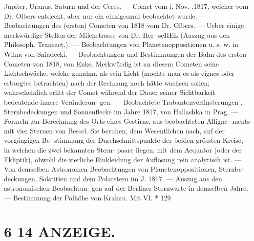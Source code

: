 \documentclass[12pt,a4paper]{article}
\begin{document}
{{{{{{{{Jupiter,  Uranus,  Saturn  und  der  Ceres.  ---   Comet  vom  i,  Nov.  .1817,  welcher vom  Dr.  Olbers  entdeckt,  aber  nur  ein  einzigesmal  beobachtet  wurde.  ---      Beobachtungen  des  (ersten) Cometen  von  1818  vom  Dr.  Olbers.  ---     Ueber  einige  merkwürdige  Stellen  der  Milchstrasse  von  Dr.  Her- scHEL  (Auszug  aus  den   Philosoph.   Transact.).  ---      Beobachtungen  von   Planetenoppositionen  u.  s.  w.    in Wilna  von  Sniadecki.  ---      Beobachtungen   und  Bestimmungen   der   Bahn   des   ersten  Cometen  von  1818, von  Enke.      Merkwürdig  ist  an  diesem  Cometen   seine   Lichtschwäche,   welche   zunahm,   als   sein   Licht (mochte  man  es  als  eignes  oder   erborgtes  betrachten)   nach  der  Rechnung  noch  hätte  wachsen  sollen; wahrscheinlich  erlitt  der  Comet  während  der  Dauer  seiner  Sichtbarkeit  bedeutende  innere  Veränderun- gen. ---     Beobachtete  Trabantenverfinsterungen ,  Sternbedeckungen  und  Sonnenflecke  im  Jahre  1817,  von Hallashka  in  Prag.  ---      Formeln   zur  Berechnung   des  Orts   eines   Gestirns,    aus   beobachteten    Alligne- ments  mit  vier  Sternen  von  Bessel.      Sie  beruhen,  dem  Wesentlichen   nach,    auf  der    vorgängigen  Be- stimmung der  Durchschnittspunkte  der  beiden  grössten  Kreise,   in  welchen    die   zwei    bekannten  Stern- paare liegen,    mit  dem  Aequator  (oder  der  Ekliptik),   obwohl    die   zierliche  Einkleidung  der  Auflösung rein  analytisch  ist.  ---     Von  demselben  Astronomen  Beobachtungen  von  Planetenoppositionen,    Sternbe- deckungen, Solstitien  und  dem  Polarstern  im  J.  1817.  ---      Auszug  aus  den  astronomischen  Beobachtun- gen auf  der  Berliner  Sternwarte  in  demselben  Jahre.  ---      Bestimmung   der  Polhöhe   von  Krakau.      Mit VI.  *  129


\section*{6 14  ANZEIGE.}

}}}}}}}}
\end{document}
